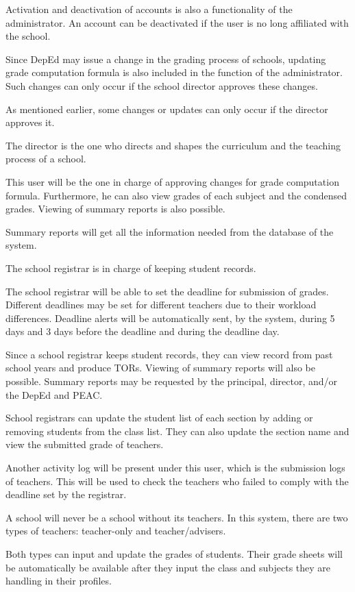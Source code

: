 \documentclass[11pt,a4paper,titlepage]{article}
\begin{document}
Activation and deactivation of accounts is also a functionality of the administrator. An account can be deactivated if the user is no long affiliated with the school.

Since DepEd may issue a change in the grading process of schools, updating grade computation formula is also included in the function of the administrator. Such changes can only occur if the school director approves these changes.

As mentioned earlier, some changes or updates can only occur if the director approves it.

The director is the one who directs and shapes the curriculum and the teaching process of a school.

This user will be the one in charge of approving changes for grade computation formula. Furthermore, he can also view grades of each subject and the condensed grades. Viewing of summary reports is also possible.

Summary reports will get all the information needed from the database of the system.

The school registrar is in charge of keeping student records.

The school registrar will be able to set the deadline for submission of grades. Different deadlines may be set for different teachers due to their workload differences. Deadline alerts will be automatically sent, by the system, during 5 days and 3 days before the deadline and during the deadline day.

Since a school registrar keeps student records, they can view record from past school years and produce TORs. Viewing of summary reports will also be possible. Summary reports may be requested by the principal, director, and/or the DepEd and PEAC.

School registrars can update the student list of each section by adding or removing students from the class list. They can also update the section name and view the submitted grade of teachers.

Another activity log will be present under this user, which is the submission logs of teachers. This will be used to check the teachers who failed to comply with the deadline set by the registrar.

A school will never be a school without its teachers. In this system, there are two types of teachers: teacher-only and teacher/advisers.

Both types can input and update the grades of students. Their grade sheets will be automatically be available after they input the class and subjects they are handling in their profiles.
\end{document}
